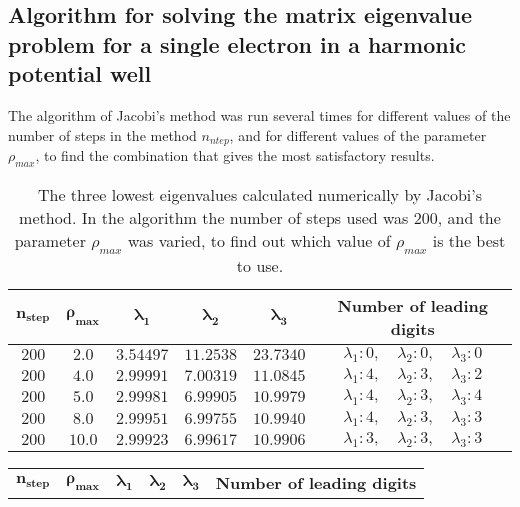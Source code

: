 \documentclass[12pt]{article}
\begin{document}
\begin{flushleft}
\subsection{Algorithm for solving the matrix eigenvalue problem for a single electron in a harmonic potential well}
The algorithm of Jacobi's method was run several times for different values of the number of steps in the method $n_{ntep}$, and for different values of the parameter $\rho_{max}$, to find the combination that gives the most satisfactory results.\\
\vspace{5mm}
\begin{table}[!h]
\begin{center}
\begin{tabular}{| c | c | c | c | c | c |}
	\hline
	$\boldsymbol{n_{step}}$ & $\boldsymbol{\rho_{max}}$ & $\boldsymbol{ \lambda_1}$ & $\boldsymbol{\lambda_2}$ & $\boldsymbol{\lambda_3}$ &  \textbf{Number of leading digits}\\
	\hline	
	$200$ & $2.0$ & $3.54497$ &  $11.2538$ & $23.7340$ & $\lambda_1:0,\quad \lambda_2:0,\quad \lambda_3:0$\\	
	$200$ & $4.0$ & $2.99991$ & $7.00319$ & $11.0845$ & $\lambda_1:4,\quad \lambda_2:3,\quad \lambda_3:2$\\
    $200$ & $5.0$ & $2.99981$ & $6.99905$& $10.9979$ & $\lambda_1:4,\quad \lambda_2:3,\quad \lambda_3:4$\\
    $200$ & $8.0$ & $2.99951$ & $6.99755$& $10.9940$ & $\lambda_1:4,\quad \lambda_2:3,\quad \lambda_3:3$\\
	$200$ & $10.0$ & $2.99923$ & $6.99617$& $10.9906$ & $\lambda_1:3,\quad \lambda_2:3,\quad \lambda_3:3$\\  
  \hline
\end{tabular}
\end{center}
\caption{\label{tab:test_rho}The three lowest eigenvalues calculated numerically by Jacobi's method. In the algorithm the number of steps used was 200, and the parameter $\rho_{max}$ was varied, to find out which value of $\rho_{max}$ is the best to use.}
\end{table}
\begin{table}[!h]
\begin{center}
\begin{tabular}{| c | c | c | c | c | c |}
	\hline
	$\boldsymbol{n_{step}} $ & $\boldsymbol{\rho_{max}}$ & $\boldsymbol{ \lambda_1}$ & $\boldsymbol{\lambda_2}$ & $\boldsymbol{\lambda_3}$ & \textbf{Number of leading digits}\\

\end{tabular}
\end{center}
\end{table}
\end{flushleft}
\end{document}
